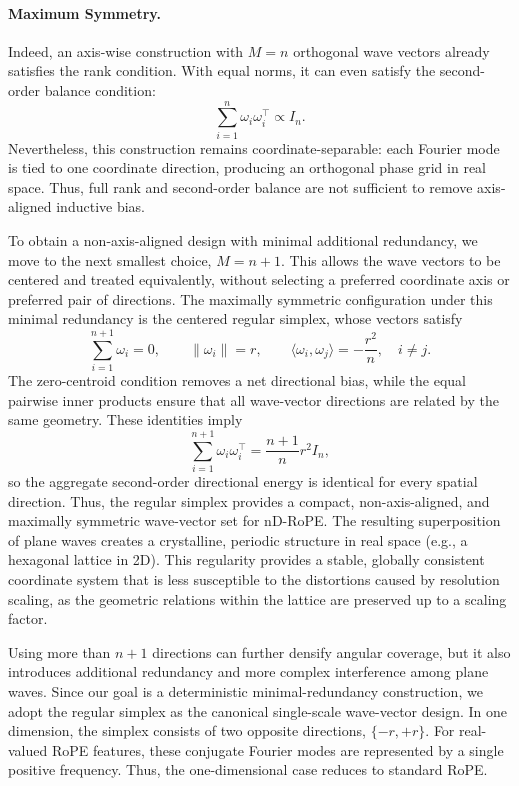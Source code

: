\documentclass{article}
\theoremstyle{plain}
\theoremstyle{definition}
\theoremstyle{remark}
\begin{document}
\paragraph{Maximum Symmetry.}
Indeed, an axis-wise construction with $M=n$ orthogonal wave vectors already satisfies the rank condition. With equal norms, it can even satisfy the second-order balance condition:
\begin{equation}
    \sum_{i=1}^{n}\omega_i\omega_i^\top \propto I_n .
\end{equation}
Nevertheless, this construction remains coordinate-separable: each Fourier mode is tied to one coordinate direction, producing an orthogonal phase grid in real space. Thus, full rank and second-order balance are not sufficient to remove axis-aligned inductive bias.

To obtain a non-axis-aligned design with minimal additional redundancy, we move to the next smallest choice, $M=n+1$. 
This allows the wave vectors to be centered and treated equivalently, without selecting a preferred coordinate axis or preferred pair of directions. 
The maximally symmetric configuration under this minimal redundancy is the centered regular simplex, whose vectors satisfy
\begin{equation}
    \sum_{i=1}^{n+1}\omega_i=0,\qquad
    \|\omega_i\|=r,\qquad
    \langle\omega_i,\omega_j\rangle=-\frac{r^2}{n},\quad i\neq j.
\end{equation}
The zero-centroid condition removes a net directional bias, while the equal pairwise inner products ensure that all wave-vector directions are related by the same geometry. 
These identities imply
\begin{equation}
    \sum_{i=1}^{n+1}\omega_i\omega_i^\top
    =
    \frac{n+1}{n}r^2 I_n,
\end{equation}
so the aggregate second-order directional energy is identical for every spatial direction. Thus, the regular simplex provides a compact, non-axis-aligned, and maximally symmetric wave-vector set for nD-RoPE. The resulting superposition of plane waves creates a crystalline, periodic structure in real space (e.g., a hexagonal lattice in 2D). This regularity provides a stable, globally consistent coordinate system that is less susceptible to the distortions caused by resolution scaling, as the geometric relations within the lattice are preserved up to a scaling factor.

Using more than $n+1$ directions can further densify angular coverage, but it also introduces additional redundancy and more complex interference among plane waves. Since our goal is a deterministic minimal-redundancy construction, we adopt the regular simplex as the canonical single-scale wave-vector design. In one dimension, the simplex consists of two opposite directions, $\{-r,+r\}$. 
For real-valued RoPE features, these conjugate Fourier modes are represented by a single positive frequency. Thus, the one-dimensional case reduces to standard RoPE.
\end{document}
